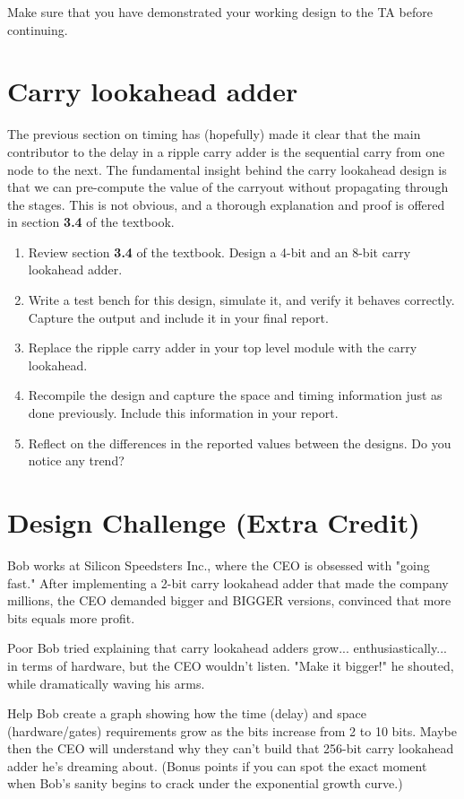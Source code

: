 \documentclass[12pt]{labmanual}
\begin{document}
\hfill\break

\begin{important}[{TA Checkoff}]
    Make sure that you have demonstrated your working design to the TA before continuing.
\end{important}



\section{Carry lookahead adder}
The previous section on timing has (hopefully) made it clear that the main contributor to the delay in a ripple carry adder is the sequential carry from one node to the next. The fundamental insight behind the carry lookahead design is that we can pre-compute the value of the carryout without propagating through the stages. This is not obvious, and a thorough explanation and proof is offered in section \textbf{3.4} of the textbook.
\hfill\break
\begin{question}
\begin{enumerate}
    \item Review section \textbf{3.4} of the textbook. Design a 4-bit and an 8-bit carry lookahead adder.
    \item Write a test bench for this design, simulate it, and verify it behaves correctly. Capture the output and include it in your final report.
    \item Replace the ripple carry adder in your top level module with the carry lookahead.
    \item Recompile the design and capture the space and timing information just as done previously. Include this information in your report.
    \item Reflect on the differences in the reported values between the designs. Do you notice any trend?
\end{enumerate}
    
\end{question}


\section{Design Challenge (Extra Credit)}
Bob works at Silicon Speedsters Inc., where the CEO is obsessed with "going fast." After implementing a 2-bit carry lookahead adder that made the company millions, the CEO demanded bigger and BIGGER versions, convinced that more bits equals more profit.

Poor Bob tried explaining that carry lookahead adders grow... enthusiastically... in terms of hardware, but the CEO wouldn't listen. "Make it bigger!" he shouted, while dramatically waving his arms.

\begin{bonusquestion}
Help Bob create a graph showing how the time (delay) and space (hardware/gates) requirements grow as the bits increase from 2 to 10 bits. Maybe then the CEO will understand why they can't build that 256-bit carry lookahead adder he's dreaming about. (Bonus points if you can spot the exact moment when Bob's sanity begins to crack under the exponential growth curve.)
\end{bonusquestion}
\end{document}
